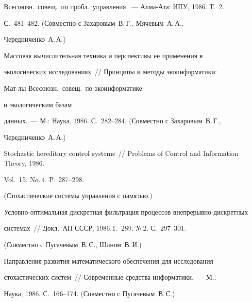 Всесоюзн.\ совещ.\ по пробл.\ управления.~--- Алма-Ата: ИПУ, 1986. Т.~2.


С.~481--482. (Совместно с Захаровым~В.\,Г., Мячевым~А.\,А.,


Чередниченко~А.\,А.)





 Массовая вычислительная техника и перспективы ее применения в


экологических исследованиях~// Принципы и методы экоинформатики:


Мат-лы Всесоюзн.\ совещ.\ по экоинформатике\linebreak


\vspace*{-12pt}





\pagebreak





\noindent


 и экологическим базам


данных.~--- М.: Наука, 1986. С.~282--284. (Совместно с Захаровым~В.\,Г.,


Чередниченко~А.\,А.)





 Stochastic hereditary control systems~// Problems of Control and Information Theory, 1986.


 Vol.~15. No.\,4. P.~287--298.


 (Стохастические системы управления с памятью.)





 Условно-оптимальная дискретная фильтрация процессов в\linebreak не\-пре\-рыв\-но-дис\-крет\-ных


 сис\-те\-мах~// Докл.\ АН СССР, 1986.\linebreak Т.~289. №\,2. С.~297--301.


(Совместно с Пугачевым~В.\,С., Шином~В.\,И.)





 Направления развития математического обеспечения для исследования


стохастических систем~// Современные средства информатики.~--- М.:


Наука, 1986. С.~166--174. (Совместно с Пугачевым~В.\,С.)





